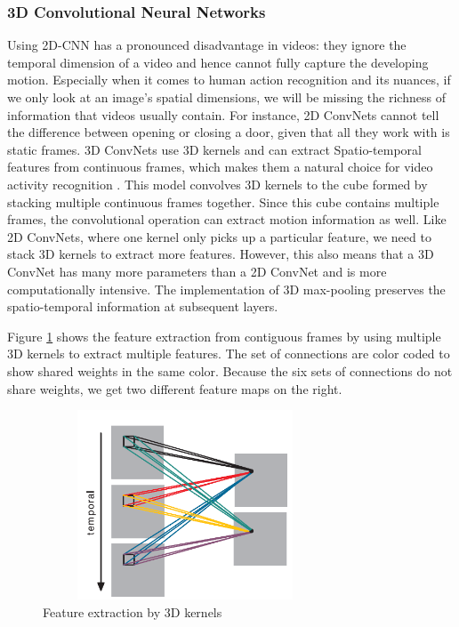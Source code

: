 \documentclass[extern,palatino]{cgMA}
\begin{document}
\subsubsection{3D Convolutional Neural Networks}
\label{3d_convolutional_neural_networks_background}

Using 2D-CNN has a pronounced disadvantage in videos: they ignore the temporal dimension of a video and hence cannot fully capture the developing motion. Especially when it comes to human action recognition and its nuances, if we only look at an image's spatial dimensions, we will be missing the richness of information that videos usually contain. For instance, 2D ConvNets cannot tell the difference between opening or closing a door, given that all they work with is static frames. 3D ConvNets use 3D kernels and can extract Spatio-temporal features from continuous frames, which makes them a natural choice for video activity recognition \cite{ji20123d}. This model convolves 3D kernels to the cube formed by stacking multiple continuous frames together. Since this cube contains multiple frames, the convolutional operation can extract motion information as well. Like 2D ConvNets, where one kernel only picks up a particular feature, we need to stack 3D kernels to extract more features. However, this also means that a 3D ConvNet has many more parameters than a 2D ConvNet and is more computationally intensive. The implementation of 3D max-pooling preserves the spatio-temporal information at subsequent layers.

Figure \ref{3d_feature_extraction} shows the feature extraction from contiguous frames by using multiple 3D kernels to extract multiple features. The set of connections are color coded to show shared weights in the same color. Because the six sets of connections do not share weights, we get two different feature maps on the right.

\begin{figure}[h]
\center
\includegraphics[height={160pt}, width={240pt}]{images/3d_feature_extraction.png}
\caption{Feature extraction by 3D kernels \cite{ji20123d}}
\label{3d_feature_extraction}
\end{figure}
\end{document}
